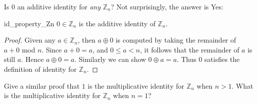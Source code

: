 Is 0 an additive identity for \emph{any} ${\mathbb Z}_n$? Not surprisingly, the answer is Yes:


\begin{prop}{id_property_Zn}
$0 \in {\mathbb Z}_n$ is the additive identity of ${\mathbb Z}_n$.
\end{prop}
\begin{proof} Given any $a \in {\mathbb Z}_n$, then $a \oplus 0$ is computed by taking the remainder of $a + 0$  mod $n$. Since $a + 0 = a$, and $0 \leq a < n$, it follows that the remainder of $a$  is still $a$. Hence $a \oplus 0 = a $. Similarly we can show $0 \oplus a = a $. Thus $0$ satisfies the definition of identity for ${\mathbb Z}_n$.
\end{proof}

\begin{exercise}{56}
Give a similar proof that $1$ is the multiplicative identity for ${\mathbb Z}_n$ when $n >1$. What is the multiplicative identity for ${\mathbb Z}_n$ when $n=1$?
\end{exercise}





